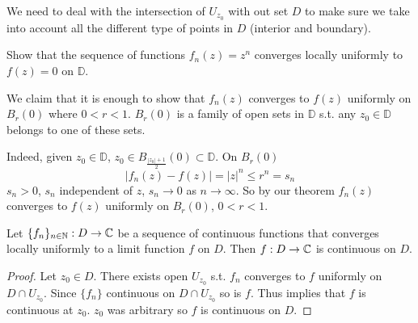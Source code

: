 \documentclass[10pt, a4paper]{article}
\begin{document}
\begin{remark}
    We need to deal with the intersection of $U_{z_0}$ with out set $D$ to make sure we take into account all the different type of points in $D$
    (interior and boundary).
\end{remark}

\begin{example}
    Show that the sequence of functions $f_n(z) = z ^ n$ converges locally uniformly to $f(z) = 0$ on $\mathbb{D}$.

    \begin{solution}
        We claim that it is enough to show that $f_n(z)$ converges to $f(z)$ uniformly on $B_r(0)$ where $0 < r < 1$.
        $B_r(0)$ is a family of open sets in $\mathbb{D}$ s.t. any $z_0 \in \mathbb{D}$ belongs to one of these sets.

        Indeed,
        given $z_0 \in \mathbb{D}$,
        $z_0 \in B_{\frac{|z_0| + 1}{2}}(0) \subset \mathbb{D}$.
        On $B_r(0)$
        \[
        |f_n(z) - f(z)| = |z| ^ n \leq r ^ n = s_n
        \]
        $s_n > 0$,
        $s_n$ independent of $z$,
        $s_n \to 0$ as $n \to \infty$.
        So by our theorem $f_n(z)$ converges to $f(z)$ uniformly on $B_r(0)$,
        $0 < r < 1$.
    \end{solution}
\end{example}

\begin{theorem}
    Let $\{f_n\}_{n \in \mathbb{N}} : D \to \mathbb{C}$ be a sequence of continuous functions that converges locally uniformly to a limit function $f$ on $D$.
    Then $f : D \to \mathbb{C}$ is continuous on $D$.

    \begin{proof}
        Let $z_0 \in D$.
        There exists open $U_{z_0}$ s.t. $f_n$ converges to $f$ uniformly on $D \cap U_{z_0}$.
        Since $\{f_n\}$ continuous on $D \cap U_{z_0}$ so is $f$.
        Thus implies that $f$ is continuous at $z_0$.
        $z_0$ was arbitrary so $f$ is continuous on $D$.
    \end{proof}
\end{theorem}
\end{document}
